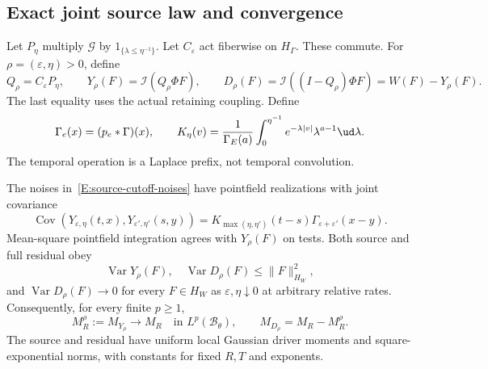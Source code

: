 \subsection{Exact joint source law and convergence}

Let $P_\eta$ multiply $\mathcal G$ by $1_{\{\lambda\le\eta^{-1}\}}$.
Let $C_\varepsilon$ act fiberwise on $H_\Gamma$. These commute. For
$\rho=(\varepsilon,\eta)>0$, define
\begin{equation}\label{E:source-cutoff-noises}
  Q_\rho=C_\varepsilon P_\eta,\qquad
  Y_\rho(F)=\mathcal I(Q_\rho\Phi F),\qquad
  D_\rho(F)=\mathcal I((I-Q_\rho)\Phi F)=W(F)-Y_\rho(F).
\end{equation}
The last equality uses the actual retaining coupling. Define
\begin{equation}\label{E:source-covariance-functions}
  \Gamma_e(x)=(p_e*\Gamma)(x),\qquad
  K_\eta(v)=\frac1{\Gamma_E(a)}
  \int_0^{\eta^{-1}}e^{-\lambda|v|}\lambda^{a-1}\ud\lambda.
\end{equation}
The temporal operation is a Laplace prefix, not temporal convolution.

\begin{proposition}
  \label{P:source-canonical-convergence}
  The noises in~\eqref{E:source-cutoff-noises} have pointfield realizations
  with joint covariance
  \begin{equation}\label{E:source-joint-covariance}
    \operatorname{Cov}(Y_{\varepsilon,\eta}(t,x),
    Y_{\varepsilon',\eta'}(s,y))
    =K_{\max(\eta,\eta')}(t-s)\Gamma_{\varepsilon+\varepsilon'}(x-y).
  \end{equation}
  Mean-square pointfield integration agrees with $Y_\rho(F)$ on tests.
  Both source and full residual obey
  \begin{equation}\label{E:source-two-dominations}
    \operatorname{Var}Y_\rho(F),\quad\operatorname{Var}D_\rho(F)
    \le\|F\|_{H_W}^2,
  \end{equation}
  and $\operatorname{Var}D_\rho(F)\to0$ for every $F\in H_W$ as
  $\varepsilon,\eta\downarrow0$ at arbitrary relative rates. Consequently,
  for every finite $p\ge1$,
  \begin{equation}\label{E:source-driver-limit}
    M_R^\rho:=M_{Y_\rho}\longrightarrow M_R
    \quad\text{in }L^p(\mathscr B_\theta),\qquad
    M_{D_\rho}=M_R-M_R^\rho.
  \end{equation}
  The source and residual have uniform local Gaussian driver moments and
  square-exponential norms, with constants for fixed $R,T$ and exponents.
\end{proposition}

